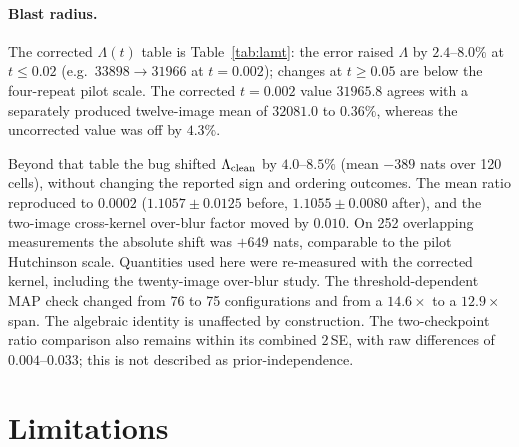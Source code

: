 \documentclass[10pt,journal]{IEEEtran}
\newcommand{\Lam}{\Lambda}
\begin{document}
\paragraph*{Blast radius.}
The corrected $\Lam(t)$ table is Table~\ref{tab:lamt}: the error raised $\Lam$ by
$2.4$--$8.0\%$ at $t\le0.02$ (e.g.\ $33898\to31966$ at $t=0.002$); changes at $t\ge0.05$ are
below the four-repeat pilot scale. The corrected $t=0.002$ value $31965.8$ agrees with a
separately produced twelve-image mean of $32081.0$ to $0.36\%$, whereas the uncorrected value
was off by $4.3\%$.

Beyond that table the bug shifted $\Lam_{\rm clean}$ by $4.0$--$8.5\%$ (mean $-389$ nats over
120 cells), without changing the reported sign and ordering outcomes. The mean ratio reproduced
to $0.0002$ ($1.1057\pm0.0125$ before, $1.1055\pm0.0080$ after), and the two-image cross-kernel
over-blur factor moved by $0.010$. On 252 overlapping measurements the absolute shift was $+649$
nats, comparable to the pilot Hutchinson scale. Quantities used here were re-measured with the
corrected kernel, including the twenty-image over-blur study. The threshold-dependent MAP check
changed from 76 to 75 configurations and from a $14.6\times$ to a $12.9\times$ span. The
algebraic identity is unaffected by construction. The two-checkpoint ratio comparison also
remains within its combined $2\,$SE, with raw differences of $0.004$--$0.033$; this is not
described as prior-independence.

\section{Limitations}
\label{sec:limits}
\end{document}
